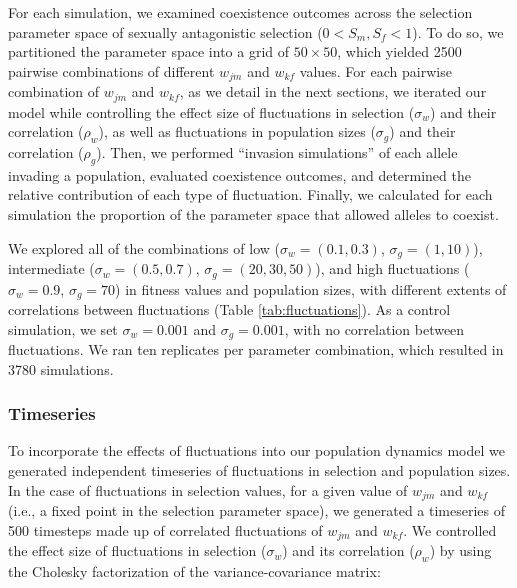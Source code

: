 For each simulation, we examined coexistence outcomes across the selection parameter space of sexually antagonistic selection ($0 < S_{m}, S_{f} < 1$). To do so, we partitioned the parameter space into a grid of $50 \times 50$, which yielded 2500 pairwise combinations of different $w_{jm}$ and $w_{kf}$ values. For each pairwise combination of $w_{jm}$ and $w_{kf}$, as we detail in the next sections, we iterated our model while controlling the effect size of  fluctuations in selection ($\sigma_{w}$) and their correlation ($\rho_{w}$), as well as fluctuations in population sizes ($\sigma_{g}$) and their correlation ($\rho_{g}$). Then, we performed ``invasion simulations''  of each allele invading a population, evaluated coexistence outcomes, and determined the relative contribution of each type of fluctuation. Finally, we calculated for each simulation the proportion of the parameter space that allowed alleles to coexist.

We explored all of  the combinations of low ($\sigma_{w}= (0.1, 0.3)$, $\sigma_{g}=(1,10)$), intermediate ($\sigma_{w}= (0.5, 0.7)$, $\sigma_{g}=(20,30,50)$), and high fluctuations ($\sigma_{w}= 0.9$, $\sigma_{g}=70$)  in fitness values and population sizes, with different extents of correlations between fluctuations (Table \ref{tab:fluctuations}).  As a control simulation, we set $\sigma_{w}= 0.001$ and  $\sigma_{g}=0.001$, with no correlation between fluctuations. We ran ten replicates per parameter combination, which resulted in 3780 simulations.

\subsubsection*{Timeseries}


To incorporate the effects of fluctuations into our population dynamics model we generated independent timeseries of fluctuations in selection and population sizes. In the case of fluctuations in selection values, for a given value of $w_{jm}$ and $w_{kf}$ (i.e., a fixed point in the selection parameter space), we generated a timeseries of 500 timesteps made up of correlated fluctuations of $w_{jm}$ and $w_{kf}$. We controlled the effect size of  fluctuations in selection ($\sigma_{w}$) and its correlation ($\rho_{w}$) by  using the Cholesky factorization of the variance-covariance matrix:


